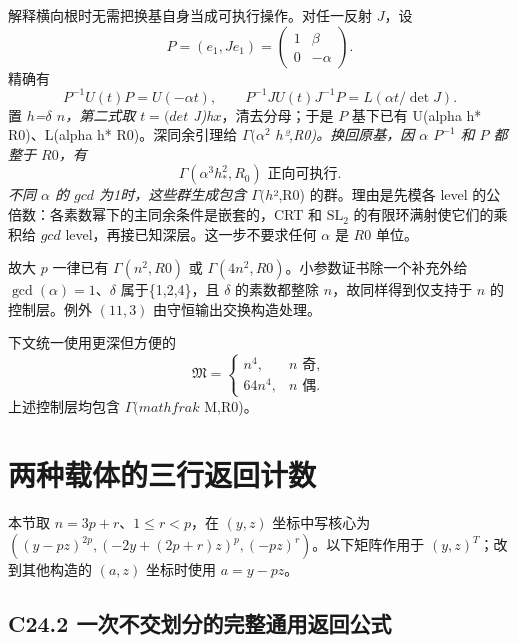 {解释横向根时无需把换基自身当成可执行操作。对任一反射} {\ensuremath{J}，设} \[
P=(e_1,Je_1)=\begin{pmatrix}1&\beta\\0&-\alpha\end{pmatrix}.
\] {精确有} \[
P^{-1}U(t)P=U(-\alpha t),\qquad
P^{-1}J U(t)J^{-1}P=L(\alpha t/\det J).
\tag{C23.5.4}
\] {置} {\ensuremath{h}}\emph{{=\ensuremath{\delta }} {\ensuremath{n}，第二式取} {\ensuremath{t=(det}} {J)h}}{\ensuremath{x}，清去分母；于是} {\ensuremath{P}} {基下已有} {U(alpha} {h*} {R0)、L(alpha} {h*} {R0)。深同余引理给} {\ensuremath{\Gamma (\alpha ^{2}}} {\ensuremath{h}}\emph{{²,R0)。换回原基，因} {\ensuremath{\alpha }} {\ensuremath{P^{-1}}} {和} {\ensuremath{P}} {都整于} {\ensuremath{R0}，有} \[
\Gamma(\alpha^3h_*^2,R_0)\text{ 正向可执行}.
\tag{C23.5.5}
\] {不同} {\ensuremath{\alpha }} {的} {\ensuremath{gcd}} {为1时，这些群生成包含} {\ensuremath{\Gamma (h}}}{²,R0)} {的群。理由是先模各} {level} {的公倍数：各素数幂下的主同余条件是嵌套的，CRT} {和} {\ensuremath{\mathrm{SL}_{2}}} {的有限环满射使它们的乘积给} {\ensuremath{gcd}} {level，再接已知深层。这一步不要求任何} {\ensuremath{\alpha }} {是} {\ensuremath{R0}} {单位。}

{故大} {\ensuremath{p}} {一律已有} {\ensuremath{\Gamma (n^{2},R0)}} {或} {\ensuremath{\Gamma (4n^{2},R0)}。小参数证书除一个补充外给} {\ensuremath{\operatorname{gcd}(\alpha )=1}、\ensuremath{\delta }} {属于\{1,2,4\}，且} {\ensuremath{\delta }} {的素数都整除} {\ensuremath{n}，故同样得到仅支持于} {\ensuremath{n}} {的控制层。例外} \((11,3)\) {由守恒输出交换构造处理。}

{下文统一使用更深但方便的} \[
\mathfrak M=\begin{cases}n^4,&n\text{ 奇},\\64n^4,&n\text{ 偶}.
\end{cases}
\tag{C23.5.6}
\] {上述控制层均包含} {\ensuremath{\Gamma (mathfrak}} {M,R0)。}


\section{两种载体的三行返回计数}\label{construct:three-row-transport}
{本节取} \(n=3p+r\){、}\(1\le r<p\){，在} \((y,z)\) {坐标中写核心为} \(((y-pz)^{2p},(-2y+(2p+r)z)^p,(-pz)^r)\){。以下矩阵作用于} \((y,z)^T\){；改到其他构造的} \((a,z)\) {坐标时使用} \(a=y-pz\){。}

\subsection*{\texorpdfstring{{C24.2} {一次不交划分的完整通用返回公式}}{C24.2 一次不交划分的完整通用返回公式}}\label{C24-h154}

